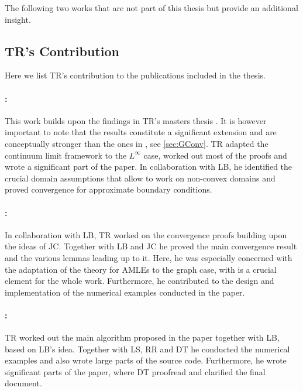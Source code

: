 \printbibliography[keyword={papersA}, resetnumbers=true, heading=none]
\printbibliography[keyword={papersB}, resetnumbers=true, heading=none]

\noindent%
The following two works that are not part of this thesis but provide an additional insight.

\printbibliography[keyword={papersC}, resetnumbers=true, heading=none]

\subsection*{TR's Contribution}

Here we list TR's contribution to the publications included in the thesis.

\paragraph{\cite{roith2022continuum}:} This work builds upon the findings in TR's masters thesis \cite{roith2022msc}. It is however important to note that the results constitute a significant extension and are conceptually stronger than the ones in \cite{roith2022msc}, see \cref{sec:GConv}. TR adapted the continuum limit framework to the $L^\infty$ case, worked out most of the proofs and wrote a significant part of the paper. In collaboration with LB, he identified the crucial domain assumptions that allow to work on non-convex domains and proved convergence for approximate boundary conditions.

\paragraph{\cite{bungert2021uniform}:} In collaboration with LB, TR worked on the convergence proofs building upon the ideas of JC. Together with LB and JC he proved the main convergence result and the various lemmas leading up to it. Here, he was especially concerned with the adaptation of the theory for AMLEs to the graph case, with is a crucial element for the whole work. Furthermore, he contributed to the design and implementation of the numerical examples conducted in the paper. 

\paragraph{\cite{bungert2021clip}:} TR worked out the main algorithm proposed in the paper together with LB, based on LB's idea. Together with LS, RR and DT he conducted the numerical examples and also wrote large parts of the source code. Furthermore, he wrote significant parts of the paper, where DT proofread and clarified the final document.

